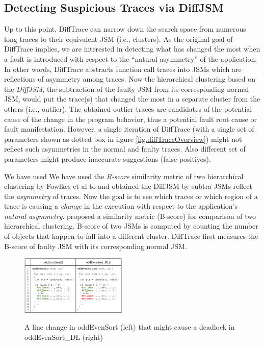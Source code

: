 \clearpage

\subsection{Detecting Suspicious Traces via DiffJSM}
Up to this point, DiffTrace can narrow down the search space from numerous long traces to their equivalent JSM (i.e., clusters).
%
As the original goal of DiffTrace implies, we are interested in detecting what has changed the most when a fault is introduced with respect to the ``natural asymmetry'' of the application.
%
In other words, DiffTrace abstracts function call traces into JSMs which are reflections of asymmetry among traces. Now the hierarchical clustering based on the \textit{DiffJSM}, the subtraction of the faulty JSM from its corresponding normal JSM, would put the trace(s) that changed the most in a separate cluster from the others (i.e., outlier).
% 
The obtained outlier traces are candidates of the potential cause of the change in the program behavior, thus a potential fault root cause or fault manifestation.
%
However, a single iteration of DiffTrace (with a single set of parameters shown as dotted box in figure \ref{fig.diffTraceOverview}) might not reflect such asymmetries in the normal and faulty traces. 
%
Also different set of parameters might produce inaccurate suggestions (false positives).
%

We have used We have used the \textit{B-score} similarity metric of two hierarchical clustering by  Fowlkes et al \cite{fowlkes83} to  and obtained the DiffJSM by subtra
%
JSMs reflect the \textit{asymmetry} of traces. Now the goal is to see which traces or which region of a trace is causing a \textit{change} in the execution with respect to the application's \textit{natural asymmetry}.
%
 proposed a similarity metric (B-score) for comparison of two hierarchical clustering. B-score of two JSMs is computed by counting the number of objects that happen to fall into a different cluster. DiffTrace  first measures the B-score of faulty JSM with its corresponding normal JSM.
\begin{figure}[]
\centering
\caption{A line change in oddEvenSort (left) that might cause a deadlock in oddEvenSort\_DL (right)}
\includegraphics[width=0.45\textwidth]{figs/oddEvenDL.png}
\label{fig.oddEvenDL}
\end{figure}

